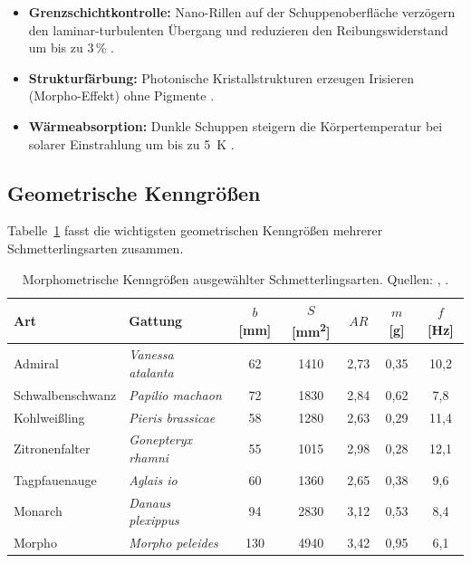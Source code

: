 ﻿\documentclass[a4paper,12pt]{article}
\theoremstyle{definition}
\begin{document}
	\begin{itemize}
		\item \textbf{Grenzschichtkontrolle:} Nano-Rillen auf der Schuppenoberfläche
		verzögern den laminar-turbulenten Übergang und reduzieren den Reibungswiderstand
		um bis zu 3\,\% \cite{chen2018butterfly}.
		\item \textbf{Strukturfärbung:} Photonische Kristallstrukturen erzeugen Irisieren
		(Morpho-Effekt) ohne Pigmente \cite{vigneron2010morpho}.
		\item \textbf{Wärmeabsorption:} Dunkle Schuppen steigern die Körpertemperatur
		bei solarer Einstrahlung um bis zu \SI{5}{\kelvin} \cite{clench1966flight}.
	\end{itemize}
	
	\subsection{Geometrische Kenngrößen}
	
	Tabelle~\ref{tab:geometrie} fasst die wichtigsten geometrischen Kenngrößen
	mehrerer Schmetterlingsarten zusammen.
	
	\begin{table}[H]
		\centering
		\caption{Morphometrische Kenngrößen ausgewählter Schmetterlingsarten.
			Quellen: \cite{betts1988wing}, \cite{jantzen2008wing}.}
		\label{tab:geometrie}
		\begin{tabular}{llccccc}
			\toprule
			Art & Gattung & $b$ [mm] & $S$ [\si{mm^2}] & $AR$ & $m$ [g] & $f$ [Hz]\\
			\midrule
			Admiral      & \textit{Vanessa atalanta}    & 62 & 1410 & 2{,}73 & 0{,}35 & 10{,}2\\
			Schwalbenschwanz & \textit{Papilio machaon}  & 72 & 1830 & 2{,}84 & 0{,}62 &  7{,}8\\
			Kohlweißling & \textit{Pieris brassicae}    & 58 & 1280 & 2{,}63 & 0{,}29 & 11{,}4\\
			Zitronenfalter & \textit{Gonepteryx rhamni} & 55 & 1015 & 2{,}98 & 0{,}28 & 12{,}1\\
			Tagpfauenauge & \textit{Aglais io}          & 60 & 1360 & 2{,}65 & 0{,}38 &  9{,}6\\
			Monarch      & \textit{Danaus plexippus}    & 94 & 2830 & 3{,}12 & 0{,}53 &  8{,}4\\
			Morpho       & \textit{Morpho peleides}    & 130 & 4940 & 3{,}42 & 0{,}95 &  6{,}1\\
			\bottomrule
		\end{tabular}
	\end{table}
	
\end{document}
